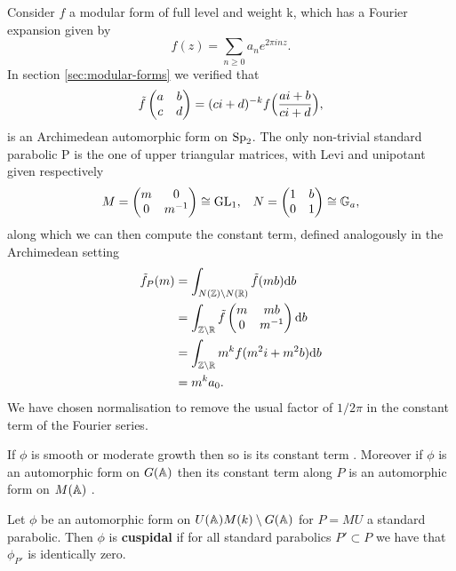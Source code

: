 \begin{example}
	Consider \(f\) a modular form of full level and weight k, which has a Fourier expansion given by 
	\[f(z) = \sum_{n\geq 0} a_ne^{2\pi i nz }.\]
	In section \ref{sec:modular-forms} we verified that 
	\[\tilde f \begin{pmatrix}
		a & b\\
		c & d
	\end{pmatrix} = (ci+d)^{-k} f\Bigl(\frac{ai+b}{ci+d}\Bigr),\]
	is an Archimedean automorphic form on \(\operatorname{Sp}_2\). The only non-trivial standard parabolic P is the one of upper triangular matrices, with Levi and unipotant given respectively 
	\[M = \begin{pmatrix} m & 0\\ 0 & m^{-1}\end{pmatrix}\cong \operatorname{GL}_1 , \;\;\; N = \begin{pmatrix} 1 & b\\ 0 & 1\end{pmatrix} \cong \mathbb{G}_a,\]
	along which we can then compute the constant term, defined analogously in the Archimedean setting
	\begin{equation*}
		\begin{aligned}
			\tilde f_P(m)
			& = \int_{N(\Z)\backslash N(\R)}\tilde f (mb) \mathrm{d}b\\
			& =  \int_{\Z\backslash\R}\tilde f \begin{pmatrix} m & mb\\ 0 & m^{-1}\end{pmatrix}\mathrm{d}b\\
			& = \int_{\Z\backslash\R} m^k f(m^2i+m^2b) \mathrm{d}b\\
			& = m^k a_0. \\
		\end{aligned}
	\end{equation*}
	We have chosen normalisation to remove the usual factor of \(1/2\pi\) in the constant term of the Fourier series.
\end{example}

If \(\phi\) is smooth or moderate growth then so is its constant term \cite[I.2.6]{moeglinSpectralDecompositionEisenstein1995}. Moreover if \(\phi\) is an automorphic form on \(G(\A)\) then its constant term along \(P\) is an automorphic form on \(M(\A)\) \cite[6.5]{getzIntroductionAutomorphicRepresentations2024}.

Let \(\phi\) be an automorphic form on \(U(\A)M(k)\setminus G(\A)\) for \(P = MU\) a standard parabolic. Then \(\phi\) is \textbf{cuspidal} if for all standard parabolics \(P'\subset P\) we have that \(\phi_{P'}\) is identically zero. 

